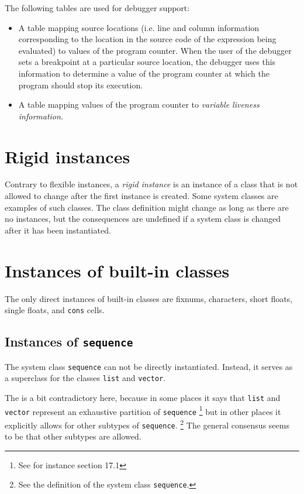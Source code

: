 The following tables are used for debugger support:

\begin{itemize}
\item A table mapping source locations (i.e. line and column
  information corresponding to the location in the source code of the
  expression being evaluated) to values of the program counter.  When
  the user of the debugger sets a breakpoint at a particular source
  location, the debugger uses this information to determine a value of
  the program counter at which the program should stop its execution.
\item A table mapping values of the program counter to \emph{variable
  liveness information}.
\end{itemize}

\section{Rigid instances}
\label{sec-data-representation-rigid-instances}

Contrary to flexible instances, a \emph{rigid instance} is an instance
of a class that is not allowed to change after the first instance is
created.  Some system classes are examples of such classes.  The class
definition might change as long as there are no instances, but the
consequences are undefined if a system class is changed after it has
been instantiated.

\section{Instances of built-in classes}

The only direct instances of built-in classes are fixnums, characters,
short floats, single floats, and \texttt{cons} cells.

\subsection{Instances of \texttt{sequence}}

The system class \texttt{sequence} can not be directly instantiated.
Instead, it serves as a superclass for the classes \texttt{list} and
\texttt{vector}.

The \hs{} is a bit contradictory here, because
in some places it says that \texttt{list} and \texttt{vector}
represent an exhaustive partition of \texttt{sequence}%
\footnote{See for instance section 17.1}
but in other places it explicitly allows for other subtypes of
\texttt{sequence}.%
\footnote{See the definition of the system class \texttt{sequence}.}
The general consensus seems to be that other subtypes are allowed.

